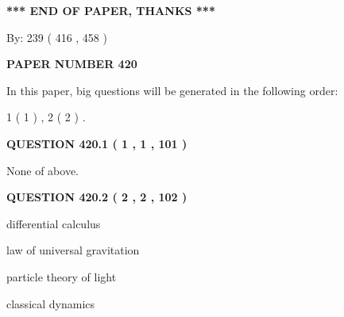 \documentclass[12pt]{article}
\begin{document}
   
\vspace{1.0in} 
{\textbf{\large{ *** END OF PAPER, THANKS *** }}} 
   
   
\hspace{1.0in} By: 
 239 ( 416 ,  458 )
   
   
   
   
\newpage 
\setcounter{page}{ 
   420001 } 
   
   
   
   
 {\textbf{ \Large{ PAPER NUMBER  420  }}}
   
   
\vspace{0.2in}
   
   
   
   
   
\vspace{0.2in}
   
In this paper, big questions will be generated in the following order: 
   
   
   1 ( 1 )
 ,
   2 ( 2 )
 .
  
\vspace{0.2in}
  
{\textbf{\Large{QUESTION
420.1 
 ( 1 , 1 , 101 )
}}}
  
  
 
 
\noindent{}
 
 
 None of above.
 
 
 
 
  
\vspace{0.2in}
  
{\textbf{\Large{QUESTION
420.2 
 ( 2 , 2 , 102 )
}}}
  
  
 
 
\noindent{}
 
 
differential calculus
 
 
law of universal gravitation
 
 
particle theory of light
 
 
classical dynamics
 
 
 
\end{document}
